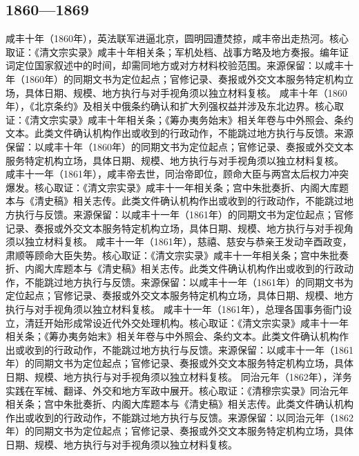 \subsection{1860—1869}
咸丰十年（1860年），英法联军进逼北京，圆明园遭焚掠，咸丰帝出走热河。核心取证：《清文宗实录》咸丰十年相关条；军机处档、战事方略及地方奏报。编年证词定位国家叙述中的时间，却需同地方或对方材料校验范围。来源保留：以咸丰十年（1860年）的同期文书为定位起点；官修记录、奏报或外交文本服务特定机构立场，具体日期、规模、地方执行与对手视角须以独立材料复核。
咸丰十年（1860年），《北京条约》及相关中俄条约确认和扩大列强权益并涉及东北边界。核心取证：《清文宗实录》咸丰十年相关条；《筹办夷务始末》相关年卷与中外照会、条约文本。此类文件确认机构作出或收到的行政动作，不能跳过地方执行与反馈。来源保留：以咸丰十年（1860年）的同期文书为定位起点；官修记录、奏报或外交文本服务特定机构立场，具体日期、规模、地方执行与对手视角须以独立材料复核。
咸丰十一年（1861年），咸丰帝去世，同治帝即位，顾命大臣与两宫太后权力冲突爆发。核心取证：《清文宗实录》咸丰十一年相关条；宫中朱批奏折、内阁大库题本与《清史稿》相关志传。此类文件确认机构作出或收到的行政动作，不能跳过地方执行与反馈。来源保留：以咸丰十一年（1861年）的同期文书为定位起点；官修记录、奏报或外交文本服务特定机构立场，具体日期、规模、地方执行与对手视角须以独立材料复核。
咸丰十一年（1861年），慈禧、慈安与恭亲王发动辛酉政变，肃顺等顾命大臣失势。核心取证：《清文宗实录》咸丰十一年相关条；宫中朱批奏折、内阁大库题本与《清史稿》相关志传。此类文件确认机构作出或收到的行政动作，不能跳过地方执行与反馈。来源保留：以咸丰十一年（1861年）的同期文书为定位起点；官修记录、奏报或外交文本服务特定机构立场，具体日期、规模、地方执行与对手视角须以独立材料复核。
咸丰十一年（1861年），总理各国事务衙门设立，清廷开始形成常设近代外交处理机构。核心取证：《清文宗实录》咸丰十一年相关条；《筹办夷务始末》相关年卷与中外照会、条约文本。此类文件确认机构作出或收到的行政动作，不能跳过地方执行与反馈。来源保留：以咸丰十一年（1861年）的同期文书为定位起点；官修记录、奏报或外交文本服务特定机构立场，具体日期、规模、地方执行与对手视角须以独立材料复核。
同治元年（1862年），洋务实践在军械、翻译、外交和地方军政中展开。核心取证：《清穆宗实录》同治元年相关条；宫中朱批奏折、内阁大库题本与《清史稿》相关志传。此类文件确认机构作出或收到的行政动作，不能跳过地方执行与反馈。来源保留：以同治元年（1862年）的同期文书为定位起点；官修记录、奏报或外交文本服务特定机构立场，具体日期、规模、地方执行与对手视角须以独立材料复核。
